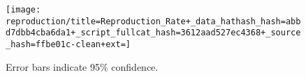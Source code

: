 \begin{figure*}[!htbp]
\begin{center}

\texttt{[image: reproduction/title=Reproduction\_Rate+\_data\_hathash\_hash=abbd7dbb4cba6da1+\_script\_fullcat\_hash=3612aad527ec4368+\_source\_hash=ffbe01c-clean+ext=]}

\caption{
Error bars indicate 95\% confidence.
}
\label{fig:reproduction}
\end{center}
\end{figure*}
